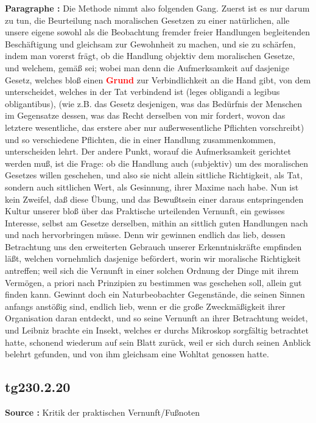 \documentclass[a4paper,12pt,twoside]{book}
\newcommand{\match}[1]{\textcolor{red}{\textbf{#1}}}
\begin{document}
	\noindent\textbf{Paragraphe : }Die Methode nimmt also folgenden Gang. Zuerst ist es nur darum zu tun, die Beurteilung nach moralischen Gesetzen zu einer natürlichen, alle unsere eigene sowohl als die Beobachtung fremder freier Handlungen begleitenden Beschäftigung und gleichsam zur Gewohnheit zu machen, und sie zu schärfen, indem man vorerst frägt, ob die Handlung objektiv dem moralischen Gesetze, und welchem, gemäß sei; wobei man denn die Aufmerksamkeit auf dasjenige Gesetz, welches bloß einen \match{Grund} zur Verbindlichkeit an die Hand gibt, von dem unterscheidet, welches in der Tat verbindend ist (leges obligandi a legibus obligantibus), (wie z.B. das Gesetz desjenigen, was das Bedürfnis der Menschen im Gegensatze dessen, was das Recht derselben von mir fordert, wovon das letztere wesentliche, das erstere aber nur außerwesentliche Pflichten vorschreibt) und so verschiedene Pflichten, die in einer Handlung zusammenkommen, unterscheiden lehrt. Der andere Punkt, worauf die Aufmerksamkeit gerichtet werden muß, ist die Frage: ob die Handlung auch (subjektiv) um des moralischen Gesetzes willen geschehen, und also sie nicht allein sittliche Richtigkeit, als Tat, sondern auch sittlichen Wert, als Gesinnung, ihrer Maxime nach habe. Nun ist kein Zweifel, daß diese Übung, und das Bewußtsein einer daraus entspringenden Kultur unserer bloß über das Praktische urteilenden Vernunft, ein gewisses Interesse, selbst am Gesetze derselben, mithin an sittlich guten Handlungen nach und nach hervorbringen müsse. Denn wir gewinnen endlich das lieb, dessen Betrachtung uns den erweiterten Gebrauch unserer Erkenntniskräfte empfinden läßt, welchen vornehmlich dasjenige befördert, worin wir moralische Richtigkeit antreffen; weil sich die Vernunft in einer solchen Ordnung der Dinge mit ihrem Vermögen, a priori nach Prinzipien zu bestimmen was geschehen soll, allein gut finden kann. Gewinnt doch ein Naturbeobachter Gegenstände, die seinen Sinnen anfangs anstößig sind, endlich lieb, wenn er die große Zweckmäßigkeit ihrer Organisation daran entdeckt,  und so seine Vernunft an ihrer Betrachtung weidet, und Leibniz brachte ein Insekt, welches er durchs Mikroskop sorgfältig betrachtet hatte, schonend wiederum auf sein Blatt zurück, weil er sich durch seinen Anblick belehrt gefunden, und von ihm gleichsam eine Wohltat genossen hatte. 
	
	\subsection*{tg230.2.20} 
	\textbf{Source : }Kritik der praktischen Vernunft/Fußnoten\\  
	
\end{document}
